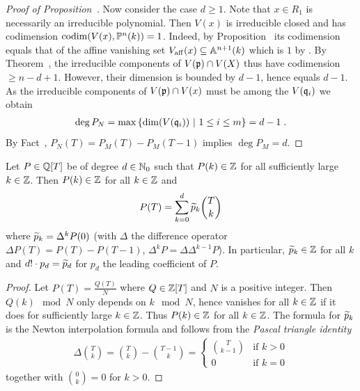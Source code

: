 \documentclass[a4paper,parskip=half,numbers=enddot, DIV=12]{scrreprt}
\begin{document}
\begin{proof}[Proof of Proposition~]
    Now consider the case $d\geq 1$. Note that $x\in R_1$ is necessarily an irreducible polynomial. Then $V(x)$ is irreducible closed and has codimension $\operatorname{codim} (V(x),\mathbb{P}^n(k))=1$. Indeed, by Proposition~ its codimension equals that of the affine vanishing set $V_{\mathrm{aff}}(x)\subseteq \mathbb{A}^{n+1}(k)$ which is $1$ by \cite[Proposition~2.1.3]{alg1}. By Theorem~, the irreducible components of $V(\mathfrak{p})\cap V(X)$ thus have codimension $\geq n-d+1$. However, their dimension is bounded by $d-1$, hence equals $d-1$. As the irreducible components of $V(\mathfrak{p})\cap V(x)$ must be among the $V(\mathfrak{q}_i)$ we obtain 
    \begin{align*}
    	\deg P_N=\max\left\{\dim(V(\mathfrak{q}_i))\ \middle|\  1\leq i\leq m\right\} = d-1\;.
    \end{align*}
    By Fact~, $P_N(T) = P_M(T) - P_M(T-1)$ implies $\deg P_M =d$.
\end{proof}
\begin{lem}[a.k.a. Lemma~1] 
    Let $P\in \mathbb{Q}[T]$ be of degree $d\in\mathbb{N}_0$ such that $P(k)\in \mathbb{Z}$ for all sufficiently large $k\in\mathbb{Z}$. Then $P(k) \in \mathbb{Z}$ for all $k\in \mathbb{Z}$ and 
    \begin{align*}
        P(T) = \sum_{k=0}^d \snake p_k \binom Tk
    \end{align*}
    where $\snake p_k = \Delta^kP(0)$ (with $\Delta$ the difference operator $\Delta P(T) = P(T)-P(T-1)$, $\Delta^k P = \Delta \Delta^{k-1} P$). In particular, $\snake p_k\in\IZ$ for all $k$ and $d!\cdot p_d = \snake p_d$ for $p_d$ the leading coefficient of $P$.
\end{lem}
\begin{proof}
    Let $P(T) = \frac{Q(T)}{N}$ where $Q\in \mathbb{Z}[T]$ and $N$ is a positive integer. Then $Q(k)\mod N$ only depends on $k\mod N$, hence vanishes for all $k\in \mathbb{Z}$ if it does for sufficiently large $k\in \mathbb{Z}$. Thus $P(k)\in \mathbb{Z}$ for all $k\in \mathbb{Z}$. The formula for $\snake p_k$ is the Newton interpolation formula and follows from the \emph{Pascal triangle identity}
    \begin{align*}
        \Delta \binom Tk= \binom{T}{k}-\binom{T-1}{k}= \begin{cases} \binom T{k-1} & \text{if }k>0\\ 0 &\text{if }k=0 \end{cases}
    \end{align*}
    together with $\binom 0k = 0$ for $k>0$.
\end{proof}
\end{document}
